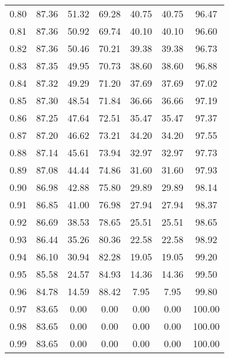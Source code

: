 \begin{tabular}{|c|c|c|c|c|c|c|}
      0.80 &     87.36 &     51.32 &      69.28 &   40.75 &      40.75 &         96.47 \\
      0.81 &     87.36 &     50.92 &      69.74 &   40.10 &      40.10 &         96.60 \\
      0.82 &     87.36 &     50.46 &      70.21 &   39.38 &      39.38 &         96.73 \\
      0.83 &     87.35 &     49.95 &      70.73 &   38.60 &      38.60 &         96.88 \\
      0.84 &     87.32 &     49.29 &      71.20 &   37.69 &      37.69 &         97.02 \\
      0.85 &     87.30 &     48.54 &      71.84 &   36.66 &      36.66 &         97.19 \\
      0.86 &     87.25 &     47.64 &      72.51 &   35.47 &      35.47 &         97.37 \\
      0.87 &     87.20 &     46.62 &      73.21 &   34.20 &      34.20 &         97.55 \\
      0.88 &     87.14 &     45.61 &      73.94 &   32.97 &      32.97 &         97.73 \\
      0.89 &     87.08 &     44.44 &      74.86 &   31.60 &      31.60 &         97.93 \\
      0.90 &     86.98 &     42.88 &      75.80 &   29.89 &      29.89 &         98.14 \\
      0.91 &     86.85 &     41.00 &      76.98 &   27.94 &      27.94 &         98.37 \\
      0.92 &     86.69 &     38.53 &      78.65 &   25.51 &      25.51 &         98.65 \\
      0.93 &     86.44 &     35.26 &      80.36 &   22.58 &      22.58 &         98.92 \\
      0.94 &     86.10 &     30.94 &      82.28 &   19.05 &      19.05 &         99.20 \\
      0.95 &     85.58 &     24.57 &      84.93 &   14.36 &      14.36 &         99.50 \\
      0.96 &     84.78 &     14.59 &      88.42 &    7.95 &       7.95 &         99.80 \\
      0.97 &     83.65 &      0.00 &       0.00 &    0.00 &       0.00 &        100.00 \\
      0.98 &     83.65 &      0.00 &       0.00 &    0.00 &       0.00 &        100.00 \\
      0.99 &     83.65 &      0.00 &       0.00 &    0.00 &       0.00 &        100.00 \\
\bottomrule
\end{tabular}
